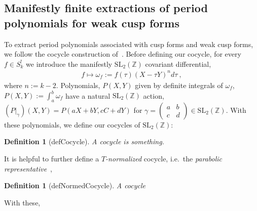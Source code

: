 \documentclass[11pt]{article}
\newtheorem{definition}[theorem]{Definition}
\numberwithin{equation}{section}  %
\newcommand{\ZZ}{\mathbb{Z}}
\newcommand{\SLZ}{\mathrm{SL}_2(\ZZ)}
\begin{document}



\subsection{Manifestly finite extractions of period polynomials for weak cusp forms}


To extract period polynomials associated with cusp forms and weak cusp forms, we 
follow the cocycle construction of~\cite{Brown2017}. Before defining our cocycle, for 
every $f \in S_k^!$ we introduce the manifestly $\SLZ$ covariant differential,
\begin{align}
f \mapsto \omega_f := f(\tau) (X - \tau Y)^n d\tau~,
\end{align}
where $n := k-2$. Polynomials, $P(X, Y)$ given by definite integrals of $\omega_f$, 
$P(X,Y):= \int_a^b \omega_f$ have a natural $\SLZ$ action, $(P|_\gamma)(X, Y) = P(aX + bY, cC + dY)$ 
for $\gamma = \left( \begin{smallmatrix} a & b \\ c & d\end{smallmatrix} \right) \in \SLZ$.
With these polynomials, we define our cocycles of $\SLZ$:
\begin{definition}[defCocycle]
A \emph{cocycle} is something.
\end{definition}
It is helpful to further define a \emph{$T$-normalized} cocycle, i.e.\ the \emph{parabolic representative}~\cite{BCD2018},
\begin{definition}[defNormedCocycle]
A \emph{cocycle}
\end{definition}
With these, 
\end{document}
